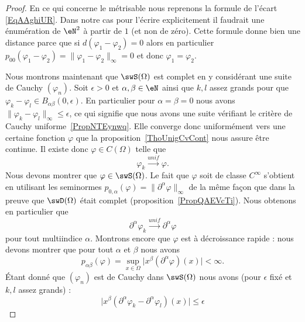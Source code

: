\begin{proof}
    En ce qui concerne le métrisable nous reprenons la formule de l'écart \eqref{EqAAghiUR}. Dans notre cas pour l'écrire explicitement il faudrait une énumération de \( \eN^2\) à partir de \( 1\) (et non de zéro). Cette formule donne bien une distance parce que si \( d(\varphi_1-\varphi_2)=0\) alors en particulier \( p_{00}(\varphi_1-\varphi_2)=\| \varphi_1-\varphi_2 \|_{\infty}=0\) et donc \( \varphi_1=\varphi_2\).

    Nous montrons maintenant que \( \swS(\Omega)\) est complet en y considérant une suite de Cauchy \( (\varphi_n)\). Soit \( \epsilon>0\) et \( \alpha,\beta\in \eN\) ainsi que \( k,l\) assez grands pour que \( \varphi_k-\varphi_l\in B_{\alpha\beta}(0,\epsilon)\). En particulier pour \( \alpha=\beta=0\) nous avons \( \| \varphi_k-\varphi_l \|_{\infty}\leq \epsilon\), ce qui signifie que nous avons une suite vérifiant le critère de Cauchy uniforme~\ref{PropNTEynwq}. Elle converge donc uniformément vers une certaine fonction \( \varphi\) que la proposition~\ref{ThoUnigCvCont} nous assure être continue. Il existe donc \( \varphi\in C(\Omega)\) telle que
    \begin{equation}
        \varphi_k\stackrel{unif}{\longrightarrow}\varphi.
    \end{equation}
    Nous devons montrer que \( \varphi\in\swS(\Omega)\). Le fait que \( \varphi\) soit de classe \(  C^{\infty}\) s'obtient en utilisant les seminormes \( p_{0,\alpha}(\varphi)=\| \partial^{\alpha}\varphi \|_{\infty}\) de la même façon que dans la preuve que \( \swD(\Omega)\) était complet (proposition~\ref{PropQAEVcTi}). Nous obtenons en particulier que
    \begin{equation}    \label{EqSZyYkqk}
        \partial^{\alpha}\varphi_k\stackrel{unif}{\longrightarrow}\partial^{\alpha}\varphi
    \end{equation}
    pour tout multiindice \( \alpha\). Montrons encore que \( \varphi\) est à décroissance rapide : nous devons montrer que pour tout \( \alpha\) et \( \beta\) nous avons
    \begin{equation}
        p_{\alpha\beta}(\varphi)=\sup_{x\in \Omega}\big| x^{\beta}(\partial^{\alpha}\varphi)(x) \big|<\infty.
    \end{equation}
    Étant donné que \( (\varphi_n)\) est de Cauchy dans \( \swS(\Omega)\) nous avons (pour \( \epsilon\) fixé et \( k,l\) assez grands) :
    \begin{equation}
        \big| x^{\beta}(\partial^{\alpha}\varphi_k-\partial^{\alpha}\varphi_l)(x) \big|\leq \epsilon

\end{equation}
\end{proof}
